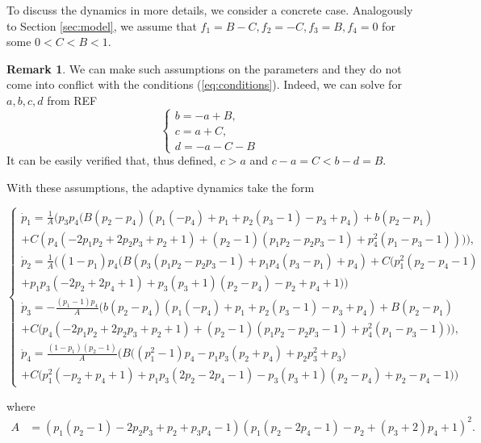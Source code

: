 \documentclass{article}
\theoremstyle{definition}
\newtheorem{remark}[theorem]{Remark}
\numberwithin{equation}{section}
\begin{document}
To discuss the dynamics in more details, we consider a concrete case. Analogously to Section \ref{sec:model}, we assume that $f_1=B-C, f_2 = -C, f_3 = B, f_4=0$ for some $0<C<B<1$. 
\begin{remark}
    We can make such assumptions on the parameters and they do not come into conflict with the conditions (\ref{eq:conditions}). Indeed, we can solve for $a,b,c,d$ from REF
    \begin{equation}
\begin{cases}
b=-a+B,\\
c=  a+C,\\
d= -a-C-B
\end{cases}
    \end{equation}
    It can be easily verified that, thus defined, $c>a$ and $c-a=  C<b-d=B$.
\end{remark}
With these assumptions, the adaptive dynamics take the form 
\begin{small}
    \begin{equation}
        \begin{cases}
        \label{eq: main sustem equatinos}
\dot{p}_1=\frac{1}{A}\Bigg(p_3 p_4 \Big(B (p_2-p_4) (p_1 (-p_4)+p_1+p_2 (p_3-1)-p_3+p_4)+b (p_2-p_1)\\+C\left(p_4 (-2 p_1 p_2+2 p_2 p_3+p_2+1)+(p_2-1) (p_1 p_2-p_2 p_3-1)+p_4^2 (p_1-p_3-1)\right)\Big)\Bigg),\\
\dot{p}_2 =  \frac{1}{A}\Bigg((1-p_1) p_4 \Big(B (p_3 (p_1 p_2-p_2 p_3-1)+p_1 p_4 (p_3-p_1)+p_4)+C \Big(p_1^2 (p_2-p_4-1)\\+
p_1 p_3 (-2 p_2+2 p_4+1)+p_3 (p_3+1) (p_2-p_4)-p_2+p_4+1\Big)\Big)\\
\dot{p}_3 = -\frac{(p_1-1) p_4}{A} \Bigg(b (p_2-p_4) (p_1 (-p_4)+p_1+p_2 (p_3-1)-p_3+p_4)+B(p_2-p_1)\\+C \Big(p_4 (-2 p_1 p_2+2 p_2 p_3+p_2+1)+(p_2-1) (p_1 p_2-p_2 p_3-1)+p_4^2 (p_1-p_3-1)\Big)\Bigg),\\
\dot{p}_4 = \frac{(1-p_1) (p_2-1)}{A} \Bigg(B \Big(\left(p_1^2-1\right) p_4-p_1 p_3 (p_2+p_4)+p_2 p_3^2+p_3\Big)\\+C \Big(p_1^2 (-p_2+p_4+1)+p_1 p_3 (2 p_2-2 p_4-1)-p_3 (p_3+1) (p_2-p_4)+p_2-p_4-1\Big)\Bigg)
        \end{cases}
    \end{equation}
\end{small}
where 
\begin{equation}
    \begin{split}
        A&=(p_1 (p_2-1)-2 p_2 p_3+p_2+p_3 p_4-1) (p_1 (p_2-2 p_4-1)-p_2+(p_3+2) p_4+1)^2.
    \end{split}
\end{equation}
\end{document}
